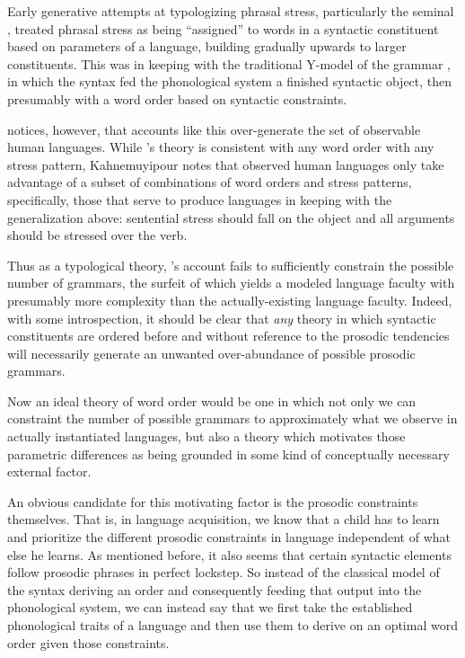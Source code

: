 \documentclass{article}
\begin{document}
Early generative attempts at typologizing phrasal stress, particularly the seminal \textcite{halle87}, treated phrasal stress as being ``assigned'' to words in a syntactic constituent based on parameters of a language, building gradually upwards to larger constituents.
This was in keeping with the traditional Y-model of the grammar \parencite{chomsky65}, in which the syntax fed the phonological system a finished syntactic object, then presumably with a word order based on syntactic constraints.

\textcite{kahnemuyipour05} notices, however, that accounts like this over-generate the set of observable human languages.
While \textcite{halle87}'s theory is consistent with any word order with any stress pattern, Kahnemuyipour notes that observed human languages only take advantage of a subset of combinations of word orders and stress patterns, specifically, those that serve to produce languages in keeping with the generalization above: sentential stress should fall on the object and all arguments should be stressed over the verb.

Thus as a typological theory, \textcite{halle87}'s account fails to sufficiently constrain the possible number of grammars, the surfeit of which yields a modeled language faculty with presumably more complexity than the actually-existing language faculty.
Indeed, with some introspection, it should be clear that \emph{any} theory in which syntactic constituents are ordered before and without reference to the prosodic tendencies will necessarily generate an unwanted over-abundance of possible prosodic grammars.

Now an ideal theory of word order would be one in which not only we can constraint the number of possible grammars to approximately what we observe in actually instantiated languages, but also a theory which motivates those parametric differences as being grounded in some kind of conceptually necessary external factor.

An obvious candidate for this motivating factor is the prosodic constraints themselves.
That is, in language acquisition, we know that a child has to learn and prioritize the different prosodic constraints in language independent of what else he learns.
As mentioned before, it also seems that certain syntactic elements follow prosodic phrases in perfect lockstep.
So instead of the classical model of the syntax deriving an order and consequently feeding that output into the phonological system, we can instead say that we first take the established phonological traits of a language and then use them to derive on an optimal word order given those constraints.
\end{document}
